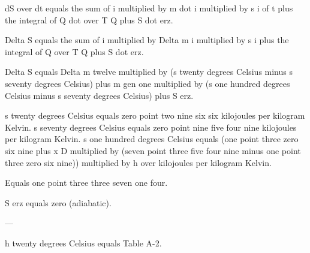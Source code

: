 dS over dt equals the sum of i multiplied by m dot i multiplied by s i of t plus the integral of Q dot over T Q plus S dot erz.  

Delta S equals the sum of i multiplied by Delta m i multiplied by s i plus the integral of Q over T Q plus S dot erz.  

Delta S equals Delta m twelve multiplied by (s twenty degrees Celsius minus s seventy degrees Celsius) plus m gen one multiplied by (s one hundred degrees Celsius minus s seventy degrees Celsius) plus S erz.  

s twenty degrees Celsius equals zero point two nine six six kilojoules per kilogram Kelvin.  
s seventy degrees Celsius equals zero point nine five four nine kilojoules per kilogram Kelvin.  
s one hundred degrees Celsius equals (one point three zero six nine plus x D multiplied by (seven point three five four nine minus one point three zero six nine)) multiplied by h over kilojoules per kilogram Kelvin.  

Equals one point three three seven one four.  

S erz equals zero (adiabatic).  

---

h twenty degrees Celsius equals Table A-2.